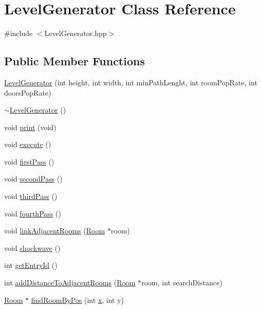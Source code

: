\hypertarget{class_level_generator}{\section{Level\-Generator Class Reference}
\label{class_level_generator}
}


{\ttfamily \#include $<$Level\-Generator.\-hpp$>$}

\subsection*{Public Member Functions}
\begin{DoxyCompactItemize}
\item 
\hyperlink{class_level_generator_a2ed675e422aedcf5ecab936468627128}{Level\-Generator} (int height, int width, int min\-Path\-Lenght, int room\-Pop\-Rate, int doors\-Pop\-Rate)
\item 
\hyperlink{class_level_generator_a9bd612e10a3d769537ba042a76c0cb5f}{$\sim$\-Level\-Generator} ()
\item 
void \hyperlink{class_level_generator_ad3a873efd53cec998e5b3cbec90b1e6d}{print} (void)
\item 
void \hyperlink{class_level_generator_a0adda93371151dcbda015fd4a9a5b971}{execute} ()
\item 
void \hyperlink{class_level_generator_a67392d5702d8bb9b28d3b87cfa4f4435}{first\-Pass} ()
\item 
void \hyperlink{class_level_generator_aaed4a6d35bf4ea14a1d472b247720f46}{second\-Pass} ()
\item 
void \hyperlink{class_level_generator_a8e8540de5d26ae5fd37f01863bb3a3ab}{third\-Pass} ()
\item 
void \hyperlink{class_level_generator_a9b9e75025c7dcacb88bcb717f2aa9f3b}{fourth\-Pass} ()
\item 
void \hyperlink{class_level_generator_aaaccd1f1c3b4331d30ba5a56b3d027f8}{link\-Adjacent\-Rooms} (\hyperlink{class_room}{Room} $\ast$room)
\item 
void \hyperlink{class_level_generator_afaa688bd1e11103c8afb45dbfa41c0c7}{shockwave} ()
\item 
int \hyperlink{class_level_generator_ab9f4dd15ee1d8f0659d3df0956d087af}{get\-Entry\-Id} ()
\item 
int \hyperlink{class_level_generator_af8a3c3f49855932e09da03107205c72f}{add\-Distance\-To\-Adjacent\-Rooms} (\hyperlink{class_room}{Room} $\ast$room, int search\-Distance)
\item 
\hyperlink{class_room}{Room} $\ast$ \hyperlink{class_level_generator_a6af493402fdf30516ea0c122d2c82a4b}{find\-Room\-By\-Pos} (int \hyperlink{jquery_8js_a4c3eadaa5164016d2c340d495fc6e55e}{x}, int y)
\end{DoxyCompactItemize}


